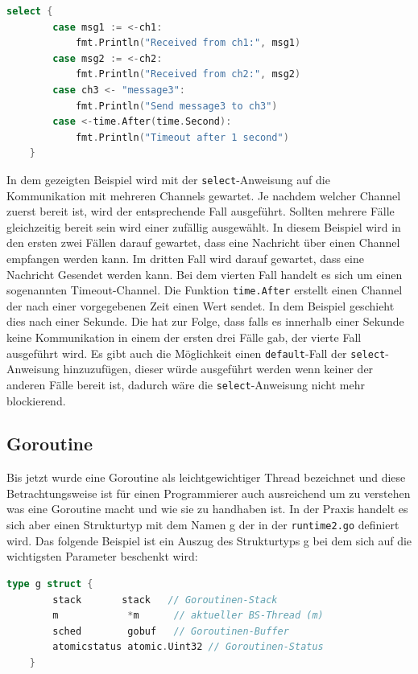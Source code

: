 \documentclass[fontsize=12pt,paper=a4,twoside=semi,parskip=half-,headsepline,headinclude]{scrreprt}
\begin{document}
\begin{lstlisting}[language=Go,extendedchars=true]
	select {
		case msg1 := <-ch1:
			fmt.Println("Received from ch1:", msg1)
		case msg2 := <-ch2:
			fmt.Println("Received from ch2:", msg2)
		case ch3 <- "message3":
			fmt.Println("Send message3 to ch3")
		case <-time.After(time.Second):
			fmt.Println("Timeout after 1 second")
	}
\end{lstlisting}

In dem gezeigten Beispiel wird mit der \texttt{select}-Anweisung auf die Kommunikation mit mehreren Channels gewartet. Je nachdem welcher Channel zuerst bereit ist, wird der entsprechende Fall ausgeführt. Sollten mehrere Fälle gleichzeitig bereit sein wird einer zufällig ausgewählt. In diesem Beispiel wird in den ersten zwei Fällen darauf gewartet, dass eine Nachricht über einen Channel empfangen werden kann. Im dritten Fall wird darauf gewartet, dass eine Nachricht Gesendet werden kann. Bei dem vierten Fall handelt es sich um einen sogenannten Timeout-Channel. Die Funktion \texttt{time.After} erstellt einen Channel der nach einer vorgegebenen Zeit einen Wert sendet. In dem Beispiel geschieht dies nach einer Sekunde. Die hat zur Folge, dass falls es innerhalb einer Sekunde keine Kommunikation in einem der ersten drei Fälle gab, der vierte Fall ausgeführt wird. Es gibt auch die Möglichkeit einen \texttt{default}-Fall der \texttt{select}-Anweisung hinzuzufügen, dieser würde ausgeführt werden wenn keiner der anderen Fälle bereit ist, dadurch wäre die \texttt{select}-Anweisung nicht mehr blockierend.

\subsection{Goroutine}

Bis jetzt wurde eine Goroutine als leichtgewichtiger Thread bezeichnet und diese Betrachtungsweise ist für einen Programmierer auch ausreichend um zu verstehen was eine Goroutine macht und wie sie zu handhaben ist. In der Praxis handelt es sich aber einen Strukturtyp mit dem Namen g der in der \texttt{runtime2.go} definiert wird. Das folgende Beispiel ist ein Auszug des Strukturtyps g bei dem sich auf die wichtigsten Parameter beschenkt wird:

\begin{lstlisting}[language=Go,extendedchars=true]
	type g struct {
		stack	    stack   // Goroutinen-Stack
		m       	 *m      // aktueller BS-Thread (m)
		sched   	 gobuf   // Goroutinen-Buffer
		atomicstatus atomic.Uint32 // Goroutinen-Status
	}
\end{lstlisting}
\end{document}
